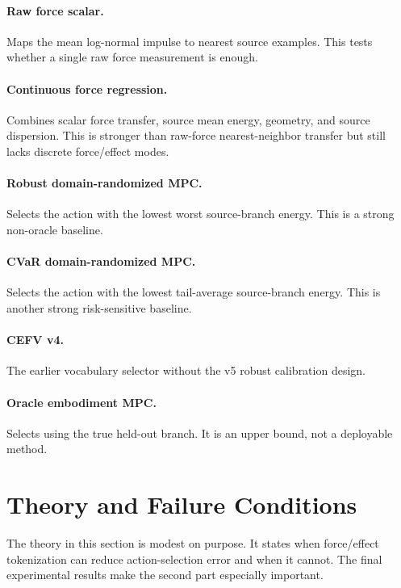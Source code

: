 \documentclass{article}
\begin{document}
\paragraph{Raw force scalar.}
Maps the mean log-normal impulse to nearest source examples. This tests whether a single raw force measurement is enough.

\paragraph{Continuous force regression.}
Combines scalar force transfer, source mean energy, geometry, and source dispersion. This is stronger than raw-force nearest-neighbor transfer but still lacks discrete force/effect modes.

\paragraph{Robust domain-randomized MPC.}
Selects the action with the lowest worst source-branch energy. This is a strong non-oracle baseline.

\paragraph{CVaR domain-randomized MPC.}
Selects the action with the lowest tail-average source-branch energy. This is another strong risk-sensitive baseline.

\paragraph{CEFV v4.}
The earlier vocabulary selector without the v5 robust calibration design.

\paragraph{Oracle embodiment MPC.}
Selects using the true held-out branch. It is an upper bound, not a deployable method.

\section{Theory and Failure Conditions}

The theory in this section is modest on purpose. It states when force/effect tokenization can reduce action-selection error and when it cannot. The final experimental results make the second part especially important.
\end{document}
